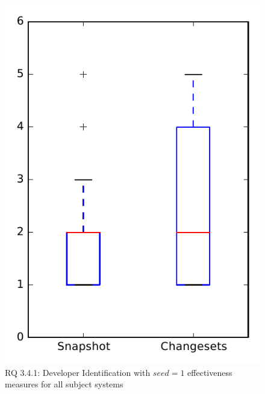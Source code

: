 
\begin{figure}
\centering
\includegraphics[height=0.4\textheight]{figures/dit_seed/rq1_overview_1}
\caption{RQ 3.4.1: Developer Identification with $seed=1$ effectiveness measures for all subject systems}
\label{fig:dit_seed:rq1:overview}
\end{figure}

